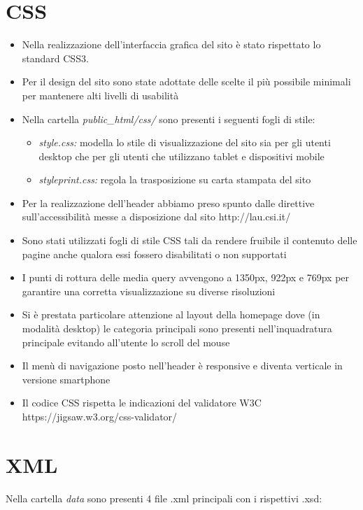 \documentclass[12pt]{article}
\begin{document}
	\section{CSS}
	\begin{itemize}
	
	
		\item Nella realizzazione dell'interfaccia grafica del sito \`e stato rispettato lo standard CSS3.
		\item Per il design del sito sono state adottate delle scelte il pi\`u possibile minimali per mantenere alti livelli di usabilit\`a
		\item Nella cartella \textit{public\_html/css/} sono presenti i seguenti fogli di stile:
		\begin{itemize}

				\item \textit{style.css:} modella lo stile di visualizzazione del sito sia per gli utenti desktop che per gli utenti che utilizzano tablet e dispositivi mobile

				\item \textit{styleprint.css:} regola la trasposizione su carta stampata del sito
		\end{itemize}
\item Per la realizzazione dell'header abbiamo preso spunto dalle direttive sull'accessibilit\`a messe a disposizione dal sito http://lau.csi.it/
\item Sono stati utilizzati fogli di stile CSS tali da rendere fruibile il contenuto delle pagine anche qualora essi fossero disabilitati o non supportati
\item I punti di rottura delle media query avvengono a 1350px, 922px e 769px per garantire una corretta visualizzazione su diverse risoluzioni
\item Si \`e prestata particolare attenzione al layout della homepage dove (in modalit\`a desktop) le categoria principali sono presenti nell'inquadratura principale evitando all'utente lo scroll del mouse
\item Il men\`u di navigazione posto nell'header \`e responsive e diventa verticale in versione smartphone
\item Il codice CSS rispetta le indicazioni del validatore W3C https://jigsaw.w3.org/css-validator/
		\end{itemize}
					\newpage
				
		\section{XML}
	Nella cartella \textit{data} sono presenti 4 file .xml principali con i rispettivi .xsd:
\end{document}
